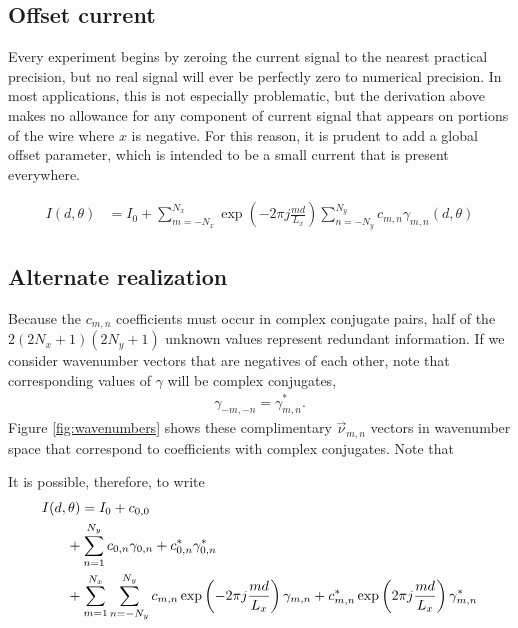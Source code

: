 \documentclass{article}
\def\vnu{\vec{\nu}_{m,n}}
\begin{document}
\subsection{Offset current}

Every experiment begins by zeroing the current signal to the nearest practical precision, but no real signal will ever be perfectly zero to numerical precision.  In most applications, this is not especially problematic, but the derivation above makes no allowance for any component of current signal that appears on portions of the wire where $x$ is negative.  For this reason, it is prudent to add a global offset parameter, which is intended to be a small current that is present everywhere.  

\begin{align}
I(d,\theta) &= I_0 + \sum_{m=-N_x}^{N_x} \exp\left(-2\pi j \frac{md}{L_x} \right) \sum_{n=-N_y}^{N_y} c_{m,n} \gamma_{m,n}(d,\theta)
\end{align}

\subsection{Alternate realization}

Because the $c_{m,n}$ coefficients must occur in complex conjugate pairs, half of the $2(2N_x+1)(2N_y+1)$ unknown values represent redundant information.  If we consider wavenumber vectors that are negatives of each other, note that corresponding values of $\gamma$ will be complex conjugates,
\begin{align}
\gamma_{-m,-n} = \gamma^*_{m,n}.
\end{align}
Figure \ref{fig:wavenumbers} shows these complimentary $\vnu$ vectors in wavenumber space that correspond to coefficients with complex conjugates.  Note that

It is possible, therefore, to write
\begin{align}
I(d,\theta) &= I_0 + c_{0,0} \nonumber\\
& \hspace{-1em} + \sum_{n=1}^{N_y} c_{0,n} \gamma_{0,n} + c_{0,n}^* \gamma^*_{0,n} \nonumber\\
& \hspace{-1em} + \sum_{m=1}^{N_x} \sum_{n=-N_y}^{N_y} c_{m,n} \exp\left(-2\pi j \frac{m d}{L_x}\right) \gamma_{m,n} +  c^*_{m,n} \exp\left(2\pi j \frac{m d}{L_x}\right) \gamma^*_{m,n}
\end{align}
\end{document}
